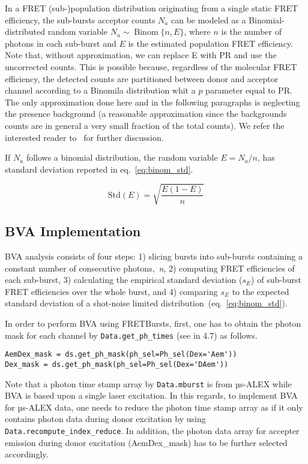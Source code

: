 In a FRET (sub-)population distribution originating from a single static FRET efficiency,
the sub-bursts acceptor counts $N_a$ can be modeled as a Binomial-distributed random variable 
$N_a \sim \operatorname{Binom} \{n, E\}$, where $n$ is the number of photons in each sub-burst and 
$E$ is the estimated population FRET efficiency. Note that, without approximation, we can replace 
E with PR and use the uncorrected counts. This is possible because, regardless of the 
molecular FRET efficiency, the detected counts are partitioned between donor and acceptor channel
according to a Binomila distribution whit a $p$ parameter equal to PR.
The only approximation done here and in the following paragraphs is neglecting the presence background
(a reasonable approximation since the backgrounds counts are in general a very small fraction of
the total counts). 
We refer the interested reader to~\cite{Torella_2011} for further discussion.

If $N_a$ follows a binomial distribution, the random variable $E = N_a/n$,
has standard deviation reported in eq.~\ref{eq:binom_std}. 

\begin{equation}
\label{eq:binom_std}
\operatorname{Std(\textit{E})} = {\sqrt{\frac{E(1 - E)}{n}}}
\end{equation}

\subsection{BVA Implementation}
BVA analysis consists of four steps: 1) slicing bursts into sub-bursts containing a constant number of consecutive photons,~\textit{n}, 2) computing FRET efficiencies of each sub-burst, 3) calculating the empirical standard deviation ($s_E$) of sub-burst FRET efficiencies over the whole burst, and 4) comparing $s_E$ to the expected standard deviation of a shot-noise limited distribution~(eq.~\ref{eq:binom_std}). 

In order to perform BVA using FRETBursts, first, one has to obtain the photon mask for each channel by \verb|Data.get_ph_times| (see in 4.7) as follows.

\begin{lstlisting}
AemDex_mask = ds.get_ph_mask(ph_sel=Ph_sel(Dex='Aem')) 
Dex_mask = ds.get_ph_mask(ph_sel=Ph_sel(Dex='DAem'))   
\end{lstlisting}

Note that a photon time stamp array by \verb|Data.mburst| is from µs-ALEX while BVA is based upon a single laser excitation. In this regards, to implement BVA for µs-ALEX data, one needs to reduce the photon time stamp array as if it only contains photon data during donor excitation by using \verb|Data.recompute_index_reduce|. In addition, the photon data array for accepter emission during donor excitation (AemDex_mask) has to be further selected accordingly.

